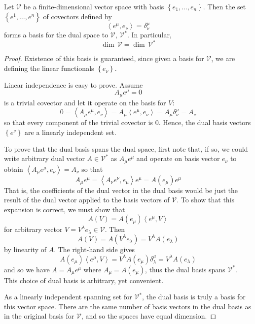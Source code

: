 \begin{prop}
Let $\mathcal{V}$ be a finite-dimensional vector space with basis $\left\{ e_{1},\ldots,e_{n}\right\}$. Then the set $\left\{ e^{1},\ldots,e^{n} \right\}$ of covectors defined by \[ \left\langle e^{\mu}, e_{\nu} \right\rangle = \delta_{\nu}^{\mu} \] forms a basis for the dual space to $\mathcal{V}$, $\mathcal{V}^{*}$. In particular, \[ \dim \, \mathcal{V} = \dim \, \mathcal{V}^{*} \]
\end{prop}
\begin{proof}
Existence of this basis is guaranteed, since given a basis for $\mathcal{V}$, we are defining the linear functionals $\left\{ e_{\nu}\right\}$.

Linear independence is easy to prove. Assume \[ A_{\mu}e^{\mu} = 0 \] is a trivial covector and let it operate on the basis for $V$: \[ 0 = \left\langle A_{\mu}e^{\mu}, e_{\nu} \right\rangle = A_{\mu} \left\langle e^{\mu}, e_{\nu} \right\rangle = A_{\mu} \delta_{\nu}^{\mu} = A_{\nu} \] so that every component of the trivial covector is $0$. Hence, the dual basis vectors $\left\{ e^{\nu} \right\}$ are a linearly independent set.

To prove that the dual basis spans the dual space, first note that, if so, we could write arbitrary dual vector $A \in \mathcal{V}^*$ as $A_{\mu}e^{\mu}$ and operate on basis vector $e_{\nu}$ to obtain $\left\langle  A_{\mu}e^{\mu}, e_{\nu} \right\rangle = A_{\nu}$ so that \[ A_{\mu} e^{\mu} = \left\langle A_{\nu}e^{\nu}, e_{\mu} \right\rangle e^{\mu} = A\left(e_{\mu}\right) e^{\mu} \] That is, the coefficients of the dual vector in the dual basis would be just the result of the dual vector applied to the basis vectors of $\mathcal{V}$. To show that this expansion is correct, we must show that \[A\left(V\right) =  A\left(e_{\mu}\right) \left\langle e^{\mu}, V\right\rangle \] for arbitrary vector $V = V^{\lambda}e_{\lambda}\in \mathcal{V}$. Then \[ A\left(V\right) = A\left(V^{\lambda}e_{\lambda}\right) = V^{\lambda}A\left(e_{\lambda}\right) \] by linearity of $A$. The right-hand side gives \[ A\left(e_{\mu}\right) \left\langle e^{\mu}, V\right\rangle = V^{\lambda} A\left(e_{\mu}\right) \delta_{\lambda}^{\mu} = V^{\lambda} A\left(e_{\lambda}\right)  \] and so we have $A = A_{\mu} e^{\mu} $ where $A_{\mu} = A\left(e_{\mu}\right)$, thus the dual basis spans $\mathcal{V}^*$. This choice of dual basis is arbitrary, yet convenient.

As a linearly independent spanning set for $\mathcal{V}^*$, the dual basis is truly a basis for this vector space. There are the same number of basis vectors in the dual basis as in the original basis for $\mathcal{V}$, and so the spaces have equal dimension.

\end{proof}


